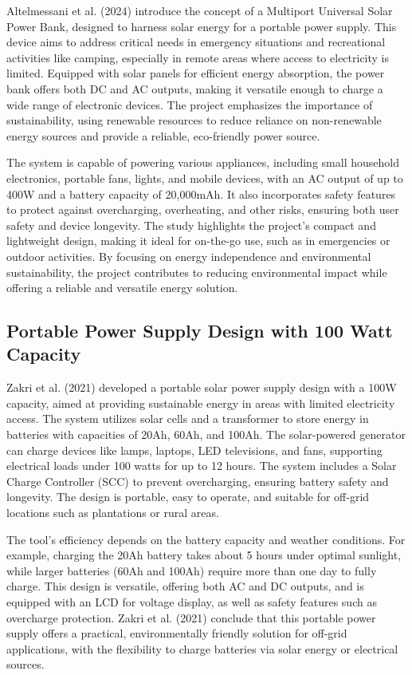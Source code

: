 {Altelmessani et al. (2024) introduce the concept of a Multiport Universal Solar Power Bank, designed to harness solar energy for a portable power supply. This device aims to address critical needs in emergency situations and recreational activities like camping, especially in remote areas where access to electricity is limited. Equipped with solar panels for efficient energy absorption, the power bank offers both DC and AC outputs, making it versatile enough to charge a wide range of electronic devices. The project emphasizes the importance of sustainability, using renewable resources to reduce reliance on non-renewable energy sources and provide a reliable, eco-friendly power source.

The system is capable of powering various appliances, including small household electronics, portable fans, lights, and mobile devices, with an AC output of up to 400W and a battery capacity of 20,000mAh. It also incorporates safety features to protect against overcharging, overheating, and other risks, ensuring both user safety and device longevity. The study highlights the project’s compact and lightweight design, making it ideal for on-the-go use, such as in emergencies or outdoor activities. By focusing on energy independence and environmental sustainability, the project contributes to reducing environmental impact while offering a reliable and versatile energy solution.

\subsection{Portable Power Supply Design with 100 Watt Capacity}

Zakri et al. (2021) developed a portable solar power supply design with a 100W capacity, aimed at providing sustainable energy in areas with limited electricity access. The system utilizes solar cells and a transformer to store energy in batteries with capacities of 20Ah, 60Ah, and 100Ah. The solar-powered generator can charge devices like lamps, laptops, LED televisions, and fans, supporting electrical loads under 100 watts for up to 12 hours. The system includes a Solar Charge Controller (SCC) to prevent overcharging, ensuring battery safety and longevity. The design is portable, easy to operate, and suitable for off-grid locations such as plantations or rural areas.

The tool's efficiency depends on the battery capacity and weather conditions. For example, charging the 20Ah battery takes about 5 hours under optimal sunlight, while larger batteries (60Ah and 100Ah) require more than one day to fully charge. This design is versatile, offering both AC and DC outputs, and is equipped with an LCD for voltage display, as well as safety features such as overcharge protection. Zakri et al. (2021) conclude that this portable power supply offers a practical, environmentally friendly solution for off-grid applications, with the flexibility to charge batteries via solar energy or electrical sources.

}
